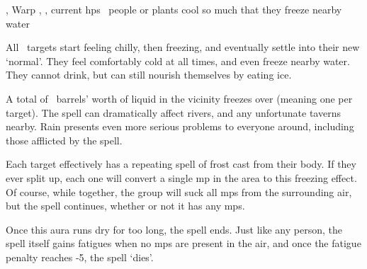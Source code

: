   {\mEarth,\mWater}%
  {Warp}%
  {\detailed, \duplicated, \divergent}%
  {current \glspl{hp}}%
  {\spellArea\ people or plants cool so much that they freeze nearby water}%
  {
    All \spellArea\ targets start feeling chilly, then freezing, and eventually settle into their new `normal'.
    They feel comfortably cold at all times, and even freeze nearby water.
    They cannot drink, but can still nourish themselves by eating ice.

    A total of \spellArea\ barrels' worth of liquid in the vicinity freezes over (meaning one per target).
    The spell can dramatically affect rivers, and any unfortunate taverns nearby.
    Rain presents even more serious problems to everyone around, including those afflicted by the spell.

    Each target effectively has a repeating spell of frost cast from their body.
    If they ever split up, each one will convert a single \gls{mp} in the area to this freezing effect.
    Of course, while together, the group will suck all \glspl{mp} from the surrounding air, but the spell continues, whether or not it has any \glspl{mp}.

    Once this aura runs dry for too long, the spell ends.
    Just like any person, the spell itself gains \glspl{fatigue} when no \glspl{mp} are present in the air, and once the \gls{fatigue} penalty reaches -5, the spell `dies'.
  }

